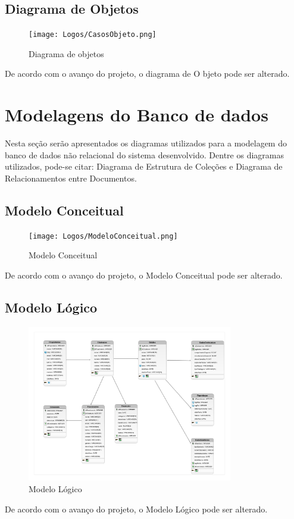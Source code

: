 \documentclass[
  a4paper,%
  12pt,%
  english,%
  brazilian,%
]{article}
\begin{document}
\newpage
    \subsection*{Diagrama de Objetos}

        \begin{figure}[h]
\centering
\caption{Diagrama de objetos}%
\label{fig:diagrama-objetos}
 \texttt{[image: Logos/CasosObjeto.png]}
\end{figure}

De acordo com o avanço do projeto, o diagrama de O  bjeto pode ser alterado.
\newpage
\section*{Modelagens do Banco de dados}
Nesta seção serão apresentados os diagramas utilizados para a modelagem do banco de dados não relacional do sistema desenvolvido. Dentre os diagramas utilizados, pode-se citar: Diagrama de Estrutura de Coleções e Diagrama de Relacionamentos entre Documentos. 

\subsection*{Modelo Conceitual}

     \begin{figure}[h]
\centering
\caption{Modelo Conceitual}%
\label{fig:modelo-conceitual}
\texttt{[image: Logos/ModeloConceitual.png]}
\end{figure}
De acordo com o avanço do projeto, o Modelo Conceitual pode ser alterado.

\newpage
    \subsection*{Modelo Lógico}

        \begin{figure}[h]
\centering
\caption{Modelo Lógico}%
\label{fig:modelo-logico}
 \includegraphics[width=0.8\textwidth]{Logos/ModeloLogico.png}
\end{figure}
De acordo com o avanço do projeto, o Modelo Lógico pode ser alterado.
\end{document}
